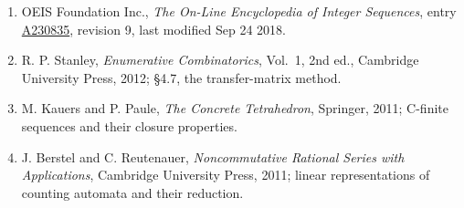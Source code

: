 \documentclass[11pt]{article}
\theoremstyle{definition}
\begin{document}
\begin{enumerate}

\item OEIS Foundation Inc., \emph{The On-Line Encyclopedia of Integer Sequences}, entry \href{https://oeis.org/A230835}{A230835}, revision 9, last modified Sep 24 2018.

\item R. P. Stanley, \emph{Enumerative Combinatorics}, Vol.~1, 2nd ed., Cambridge University Press, 2012; \S4.7, the transfer-matrix method.

\item M. Kauers and P. Paule, \emph{The Concrete Tetrahedron}, Springer, 2011; C-finite sequences and their closure properties.

\item J. Berstel and C. Reutenauer, \emph{Noncommutative Rational Series with Applications}, Cambridge University Press, 2011; linear representations of counting automata and their reduction.

\end{enumerate}
\end{document}
